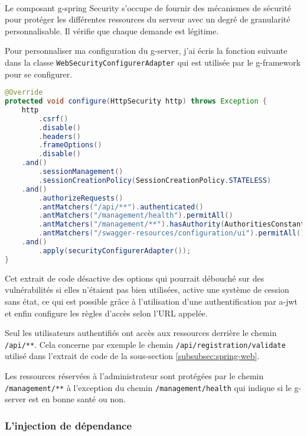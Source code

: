 \paragraph{}
Le composant \gls{g-spring} Security s'occupe de fournir des mécanismes de sécurité pour protéger les différentes ressources du serveur avec un degré de granularité personnalisable.
Il vérifie que chaque demande est légitime.

Pour personnaliser ma configuration du \gls{g-server}, j'ai écris la fonction suivante dans la classe \lstinline{WebSecurityConfigurerAdapter} qui est utilisée par le \gls{g-framework} pour se configurer.
\begin{lstlisting}[language=Java]
@Override
protected void configure(HttpSecurity http) throws Exception {
    http
        .csrf()
        .disable()
        .headers()
        .frameOptions()
        .disable()
    .and()
        .sessionManagement()
        .sessionCreationPolicy(SessionCreationPolicy.STATELESS)
    .and()
        .authorizeRequests()
        .antMatchers("/api/**").authenticated()
        .antMatchers("/management/health").permitAll()
        .antMatchers("/management/**").hasAuthority(AuthoritiesConstants.ADMIN)
        .antMatchers("/swagger-resources/configuration/ui").permitAll()
    .and()
        .apply(securityConfigurerAdapter());
}
\end{lstlisting}
Cet extrait de code désactive des options qui pourrait débouché sur des vulnérabilités si elles n'étaient pas bien utilisées\cite{noauthor_cross-site_nodate},
active une système de cession sans état\fnmark{}, ce qui est possible grâce à l'utilisation d'une authentification par \gls{a-jwt}
et enfin configure les règles d'accès selon l'URL appelée.

Seul les utilisateurs authentifiés ont accès aux ressources derrière le chemin \lstinline{/api/**}.
Cela concerne par exemple le chemin \lstinline{/api/registration/validate} utilisé dans l'extrait de code de la sous-section \ref{subsubsec:spring-web}.

Les ressources réservées à l'administrateur sont protégées par le chemin \lstinline{/management/**} à l'exception du chemin \lstinline{/management/health} qui indique si le \gls{g-server} est en bonne santé ou non.

\subsubsection{L'injection de dépendance}
\label{subsubsec:dependency-injection}

